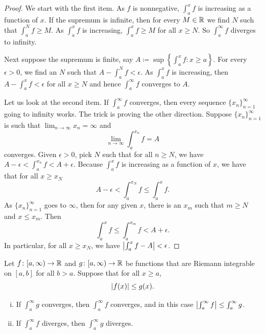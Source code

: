 \begin{proof}
We start with the first item.
As $f$ is nonnegative,
$\int_a^x f$ is increasing as a function of $x$.
If the supremum is infinite, then for every $M \in {\mathbb{R}}$
we find $N$ such that $\int_a^N f \geq M$.  As $\int_a^x f$
is increasing, $\int_a^x f \geq M$ for all $x \geq N$.  So
$\int_a^\infty f$ diverges to infinity.

Next suppose the supremum is finite, say
$A \coloneqq \sup \left\{ \int_a^x f : x \geq a \right\}$.
For every $\epsilon > 0$, we find an $N$ such that
$A - \int_a^N f < \epsilon$.  As $\int_a^x f$ is increasing,
then
$A - \int_a^x f < \epsilon$ for all $x \geq N$ and hence
$\int_a^\infty f$ converges to $A$.

Let us look at the second item.
If $\int_a^\infty f$ converges, then every sequence $\{ x_n \}_{n=1}^\infty$ going to
infinity works.  The trick is
proving the other direction.  Suppose $\{ x_n \}_{n=1}^\infty$ is such that
$\lim_{n\to\infty} x_n = \infty$ and
\begin{equation*}
\lim_{n\to\infty} \int_a^{x_n} f = A
\end{equation*}
converges.  Given $\epsilon > 0$, pick $N$ such that for
all $n \geq N$, we have
$A - \epsilon < \int_a^{x_n} f < A + \epsilon$.
Because $\int_a^x f$ is increasing as a function of $x$, we have that for all
$x \geq x_N$
\begin{equation*}
A - \epsilon < \int_a^{x_N} f \leq \int_a^x f .
\end{equation*}
As $\{ x_n \}_{n=1}^\infty$ goes to $\infty$, then for any given
$x$, there is an $x_m$ such that $m \geq N$ and $x \leq x_m$.  Then
\begin{equation*}
\int_a^{x} f \leq \int_a^{x_m} f < A + \epsilon .
\end{equation*}
In particular, for all $x \geq x_N$, we have
$\left\lvert {\int_a^{x} f - A} \right\rvert < \epsilon$.
\end{proof}

\begin{prop}%
Let
$f \colon [a,\infty) \to {\mathbb{R}}$ and
$g \colon [a,\infty) \to {\mathbb{R}}$ be functions
that are Riemann integrable on $[a,b]$ for all $b > a$.   Suppose
that for all $x \geq a$,
\begin{equation*}
\left\lvert {f(x)} \right\rvert \leq g(x) .
\end{equation*}
\begin{enumerate}[(i)]
\item If $\int_a^\infty g$ converges, then $\int_a^\infty f$ converges,
and in this case 
$\left\lvert {\int_a^\infty f} \right\rvert \leq \int_a^\infty g$.
\item If $\int_a^\infty f$ diverges, then $\int_a^\infty g$ diverges.
\end{enumerate}
\end{prop}

